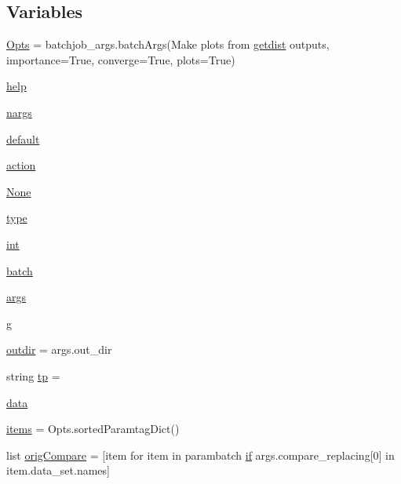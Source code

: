 \subsection*{Variables}
\begin{DoxyCompactItemize}
\item 
\mbox{\hyperlink{namespacemakePlots_aadd603ab7f6d24d6997092505872a796}{Opts}} = batchjob\+\_\+args.\+batch\+Args(\textquotesingle{}Make plots from \mbox{\hyperlink{GetDist_8f90_a78c185cfd3ac27937ede022b24ae72e9}{getdist}} outputs\textquotesingle{}, importance=True, converge=True, plots=True)
\item 
\mbox{\hyperlink{namespacemakePlots_ab052db806838452fcdaab72322f5dc2d}{help}}
\item 
\mbox{\hyperlink{namespacemakePlots_a9b640bed4260e0918152ac371f83bdb2}{nargs}}
\item 
\mbox{\hyperlink{namespacemakePlots_a79482c7601d11e7655849e59f8801500}{default}}
\item 
\mbox{\hyperlink{namespacemakePlots_a76a9445ec7aead94905940da5ccc0ad9}{action}}
\item 
\mbox{\hyperlink{namespacemakePlots_a3238f10f1131f7601fd8e875b7ca07b9}{None}}
\item 
\mbox{\hyperlink{namespacemakePlots_a174e217cb2f1b697784d34498aa61167}{type}}
\item 
\mbox{\hyperlink{namespacemakePlots_a62410dfcf581decbab96b59ad4b9f70d}{int}}
\item 
\mbox{\hyperlink{namespacemakePlots_addc534cd9458153ac1e2d3a26f0b8cb3}{batch}}
\item 
\mbox{\hyperlink{namespacemakePlots_a9da25c8831150382fe5c74d311978581}{args}}
\item 
\mbox{\hyperlink{namespacemakePlots_a94a6ce1910c38b0ce10380c5f4fc69ec}{g}}
\item 
\mbox{\hyperlink{namespacemakePlots_aa6a6744b257462647c396e09d585774e}{outdir}} = args.\+out\+\_\+dir
\item 
string \mbox{\hyperlink{namespacemakePlots_a374a7cc6f2ae895a5c2912c5b9307d89}{tp}} = \textquotesingle{}\textquotesingle{}
\item 
\mbox{\hyperlink{namespacemakePlots_ad0950469221279c8b9cd3dba3e05a285}{data}}
\item 
\mbox{\hyperlink{namespacemakePlots_ac08323f0091ba3d90d098035659bdbb5}{items}} = Opts.\+sorted\+Paramtag\+Dict()
\item 
list \mbox{\hyperlink{namespacemakePlots_a88ed9851e2e4079a4ce7452fd12531bc}{orig\+Compare}} = \mbox{[}item for item in parambatch \mbox{\hyperlink{plotTT_8m_a722e57dd98d67aec0b3589ce8efff8bb}{if}} args.\+compare\+\_\+replacing\mbox{[}0\mbox{]} in item.\+data\+\_\+set.\+names\mbox{]}

\end{DoxyCompactItemize}

